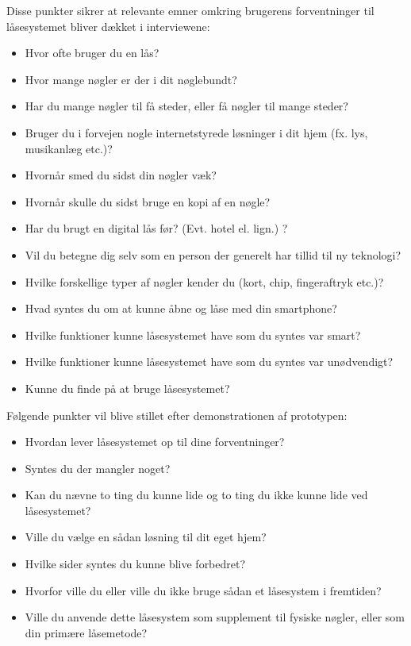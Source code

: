 \documentclass[a4paper,12pt]{article}
\begin{document}
Disse punkter sikrer at relevante emner omkring brugerens forventninger til låsesystemet bliver dækket i interviewene:

\begin{itemize}
    \item Hvor ofte bruger du en lås?
    \item Hvor mange nøgler er der i dit nøglebundt?
    \item Har du mange nøgler til få steder, eller få nøgler til mange steder?
    \item Bruger du i forvejen nogle internetstyrede løsninger i dit hjem (fx. lys, musikanlæg etc.)?
    \item Hvornår smed du sidst din nøgler væk?
    \item Hvornår skulle du sidst bruge en kopi af en nøgle?
    \item Har du brugt en digital lås før? (Evt. hotel el. lign.) ?
    \item Vil du betegne dig selv som en person der generelt har tillid til ny teknologi?
    \item Hvilke forskellige typer af nøgler kender du (kort, chip, fingeraftryk etc.)?
    \item Hvad syntes du om at kunne åbne og låse med din smartphone?
    \item Hvilke funktioner kunne låsesystemet have som du syntes var smart?
    \item Hvilke funktioner kunne låsesystemet have som du syntes var unødvendigt?
    \item Kunne du finde på at bruge låsesystemet?
\end{itemize}
Følgende punkter vil blive stillet efter demonstrationen af prototypen:

\begin{itemize}
    \item Hvordan lever låsesystemet op til dine forventninger?
    \item Syntes du der mangler noget?
    \item Kan du nævne to ting du kunne lide og to ting du ikke kunne lide ved låsesystemet?
    \item Ville du vælge en sådan løsning til dit eget hjem?
    \item Hvilke sider syntes du kunne blive forbedret?
    \item Hvorfor ville du eller ville du ikke bruge sådan et låsesystem i fremtiden?
    \item Ville du anvende dette låsesystem som supplement til fysiske nøgler, eller som din primære låsemetode?
\end{itemize}
\end{document}
